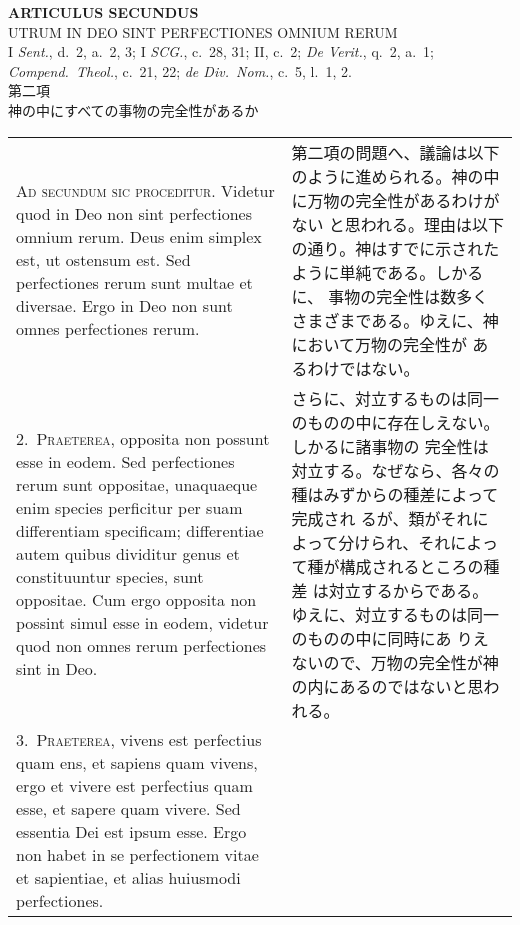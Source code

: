 \documentclass[10pt]{jsarticle} %
\begin{document}
\begin{center}
 {\Large {\bf ARTICULUS SECUNDUS}}\\
 {\large UTRUM IN DEO SINT PERFECTIONES OMNIUM RERUM}\\
 {\footnotesize I {\itshape Sent.}, d.~2, a.~2, 3; I {\itshape SCG.},
 c.~28, 31; II, c.~2; {\itshape De Verit.}, q.~2, a.~1; {\itshape
 Compend.~Theol.}, c.~21, 22; {\itshape de Div.~Nom.}, c.~5, l.~1, 2.}\\
 {\Large 第二項\\神の中にすべての事物の完全性があるか }
\end{center}

\begin{longtable}{p{21em}p{21em}}

 

{\huge A}{\scshape d secundum sic proceditur}. Videtur quod in Deo non
 sint perfectiones omnium rerum. Deus enim simplex est, ut ostensum
 est. Sed perfectiones rerum sunt multae et diversae. Ergo in Deo non
 sunt omnes perfectiones rerum.
&

第二項の問題へ、議論は以下のように進められる。神の中に万物の完全性があるわけがない
 と思われる。理由は以下の通り。神はすでに示されたように単純である。しかるに、
 事物の完全性は数多くさまざまである。ゆえに、神において万物の完全性が
 あるわけではない。

\\

2.~{\scshape Praeterea}, opposita non possunt esse in eodem. Sed
 perfectiones rerum sunt oppositae, unaquaeque enim species perficitur
 per suam differentiam specificam; differentiae autem quibus dividitur
 genus et constituuntur species, sunt oppositae. Cum ergo opposita non
 possint simul esse in eodem, videtur quod non omnes rerum perfectiones
 sint in Deo.
&

さらに、対立するものは同一のものの中に存在しえない。しかるに諸事物の
 完全性は対立する。なぜなら、各々の種はみずからの種差によって完成され
 るが、類がそれによって分けられ、それによって種が構成されるところの種差
 は対立するからである。ゆえに、対立するものは同一のものの中に同時にあ
 りえないので、万物の完全性が神の内にあるのではないと思われる。

\\



3.~{\scshape Praeterea}, vivens est perfectius quam ens, et sapiens quam
 vivens, ergo et vivere est perfectius quam esse, et sapere quam
 vivere. Sed essentia Dei est ipsum esse. Ergo non habet in se
 perfectionem vitae et sapientiae, et alias huiusmodi perfectiones.


\end{longtable}
\end{document}
